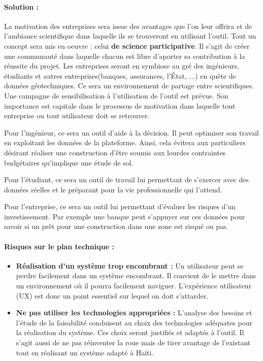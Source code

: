         \paragraph{Solution :}
        La motivation des entreprises sera issue des avantages que l'on leur offrira et de l'ambiance
        scientifique dans laquelle ils se trouveront en utilisant l'outil. 
        Tout un concept sera mis en oeuvre : celui  \textbf{de science participative}.
        Il s'agit de créer une communauté dans laquelle chacun est libre d'aporter sa contribution 
        à la réussite du projet. Les entreprises seront en symbiose au gré des ingénieurs, étudiants 
        et autres entreprises(banques, assurances, l'État, ...) en quête de données géotechniques.
        Ce sera un environnement de partage entre scientifiques. Une campagne de sensibilisation à l'utilisation 
        de l'outil est prévue. Son importance est capitale dans le processus de motivation dans laquelle 
        tout entreprise ou tout utilisateur doit se retrouver.
        \par
        Pour l'ingénieur, ce sera un outil d'aide à la décision. Il peut optimiser son travail en exploitant
        les données de la plateforme. Ainsi, cela évitera aux particuliers désirant réaliser une construction
        d'être soumis aux lourdes contraintes budgétaires qu'implique une étude de sol.
        \par
        Pour l'étudiant, ce sera un outil de travail lui permettant de s'exercer avec des données réelles 
        et le préparant pour la vie professionnelle qui l'attend.
        \par
        Pour l'entreprise, ce sera un outil lui permettant d'évaluer les risques d'un investissement. Par 
        exemple une banque peut s'appuyer sur ces données pour savoir si un prêt pour une construction dans une zone
        est risqué ou pas.

        \paragraph{Risques sur le plan technique :}
        \begin{itemize}
            \item \textbf{Réalisation d'un système trop encombrant :}
            Un utilisateur peut se perdre facilement dans un système encombrant. Il convient de le mettre dans un environnement
            où il pourra facilement naviguer. L'expérience utilisateur (UX) est donc un point essentiel sur lequel on doit s'attarder.
            \item \textbf{Ne pas utiliser les technologies appropriées :}
            L'analyse des besoins et l'étude de la faisabilité conduisent au choix des technologies adéquates pour la réalisation
            du système. Ces choix seront justifiés et adaptés à l'outil. 
            Il s'agit aussi de ne pas réinventer la roue mais de tirer avantage de l'existant tout en réalisant 
            un système adapté à Haïti.
        \end{itemize}

